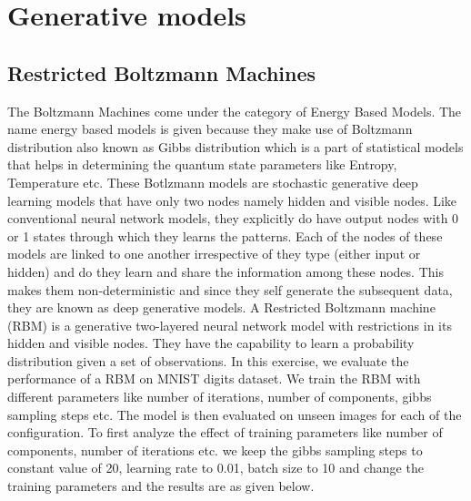 \chapter{Generative models}
\section{Restricted Boltzmann Machines}
The Boltzmann Machines come under the category of Energy Based Models. The name energy based models is given because they make use of Boltzmann distribution also known as Gibbs distribution which is a part of statistical models that helps in determining the quantum state parameters like Entropy, Temperature etc.   These Botlzmann models are stochastic generative deep learning models that have only two nodes namely hidden and visible nodes. Like conventional neural network models, they explicitly do have output nodes with 0 or 1 states through which they learns the patterns. Each of the nodes of these models are linked to one another irrespective of they type (either input or hidden) and do they learn and share the information among these nodes. This makes them non-deterministic and since they self generate the subsequent data, they are known as deep generative models. A Restricted Boltzmann machine (RBM) is a generative two-layered neural network model with restrictions in its hidden and visible nodes. They have the capability to learn a probability distribution given a set of observations. In this exercise, we evaluate the performance of a RBM on MNIST digits dataset. We train the RBM with different parameters like number of iterations, number of components, gibbs sampling steps etc. The model is then evaluated on unseen images for each of the configuration. To first analyze the effect of training parameters like number of components, number of iterations etc. we keep the gibbs sampling steps to  constant value of 20, learning rate to 0.01, batch size to 10 and change the training parameters and the results are as given below.
